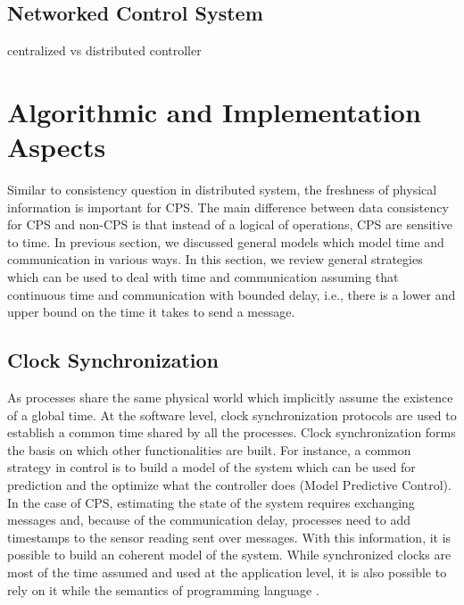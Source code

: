 \documentclass[
graybox,
envcountchap
]{svmult}
\begin{document}
\begin{bibunit}
    



    \subsection{Networked Control System}

    centralized vs distributed controller

\section{Algorithmic and Implementation Aspects} %

    Similar to consistency question in distributed system, the freshness of physical information is important for CPS.
    The main difference between data consistency for CPS and non-CPS is that instead of a logical of operations, CPS are sensitive to time.
    In previous section, we discussed general models which model time and communication in various ways.
    In this section, we review general strategies which can be used to deal with time and communication assuming that continuous time and communication with bounded delay, i.e., there is a lower and upper bound on the time it takes to send a message.

    \subsection{Clock Synchronization}
    
    As processes share the same physical world which implicitly assume the existence of a global time.
    At the software level, clock synchronization protocols are used to establish a common time shared by all the processes.
    Clock synchronization forms the basis on which other functionalities are built.
    For instance, a common strategy in control is to build a model of the system which can be used for prediction and the optimize what the controller does (Model Predictive Control).
    In the case of CPS, estimating the state of the system requires exchanging messages and, because of the communication delay, processes need to add timestamps to the sensor reading sent over messages.
    With this information, it is possible to build an coherent model of the system.
    While synchronized clocks are most of the time assumed and used at the application level, it is also possible to rely on it while the semantics of programming language \cite{DBLP:conf/dac/LohstrohSGWGSL19,DBLP:conf/emsoft/LohstrohSJWL19}.
    

\end{bibunit}
\end{document}
